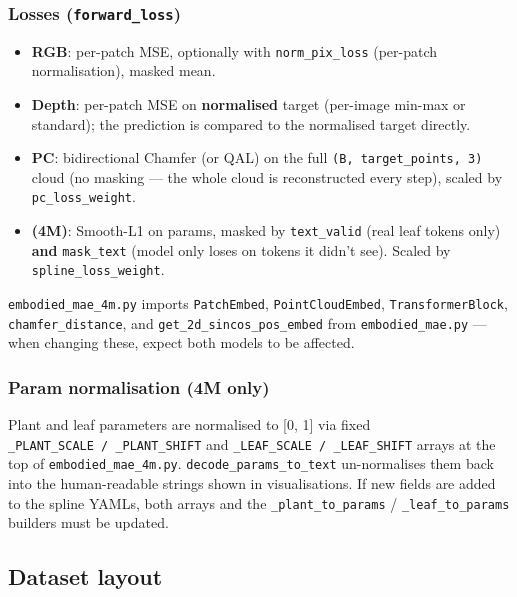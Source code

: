 \documentclass[
  10pt,
]{article}
\providecommand{\tightlist}{%
  \setlength{\itemsep}{0pt}\setlength{\parskip}{0pt}}
\begin{document}
\subsubsection{\texorpdfstring{Losses
(\texttt{forward\_loss})}{Losses (forward\_loss)}}\label{losses-forward_loss}

\begin{itemize}
\tightlist
\item
  \textbf{RGB}: per-patch MSE, optionally with \texttt{norm\_pix\_loss}
  (per-patch normalisation), masked mean.
\item
  \textbf{Depth}: per-patch MSE on \textbf{normalised} target (per-image
  min-max or standard); the prediction is compared to the normalised
  target directly.
\item
  \textbf{PC}: bidirectional Chamfer (or QAL) on the full
  \texttt{(B,\ target\_points,\ 3)} cloud (no masking --- the whole
  cloud is reconstructed every step), scaled by
  \texttt{pc\_loss\_weight}.
\item
  \textbf{(4M)}: Smooth-L1 on params, masked by \texttt{text\_valid}
  (real leaf tokens only) \textbf{and} \texttt{mask\_text} (model only
  loses on tokens it didn't see). Scaled by
  \texttt{spline\_loss\_weight}.
\end{itemize}

\texttt{embodied\_mae\_4m.py} imports \texttt{PatchEmbed},
\texttt{PointCloudEmbed}, \texttt{TransformerBlock},
\texttt{chamfer\_distance}, and \texttt{get\_2d\_sincos\_pos\_embed}
from \texttt{embodied\_mae.py} --- when changing these, expect both
models to be affected.

\subsubsection{Param normalisation (4M
only)}\label{param-normalisation-4m-only}

Plant and leaf parameters are normalised to {[}0, 1{]} via fixed
\texttt{\_PLANT\_SCALE\ /\ \_PLANT\_SHIFT} and
\texttt{\_LEAF\_SCALE\ /\ \_LEAF\_SHIFT} arrays at the top of
\texttt{embodied\_mae\_4m.py}. \texttt{decode\_params\_to\_text}
un-normalises them back into the human-readable strings shown in
visualisations. If new fields are added to the spline YAMLs, both arrays
and the \texttt{\_plant\_to\_params} / \texttt{\_leaf\_to\_params}
builders must be updated.

\subsection{Dataset layout}\label{dataset-layout}
\end{document}
